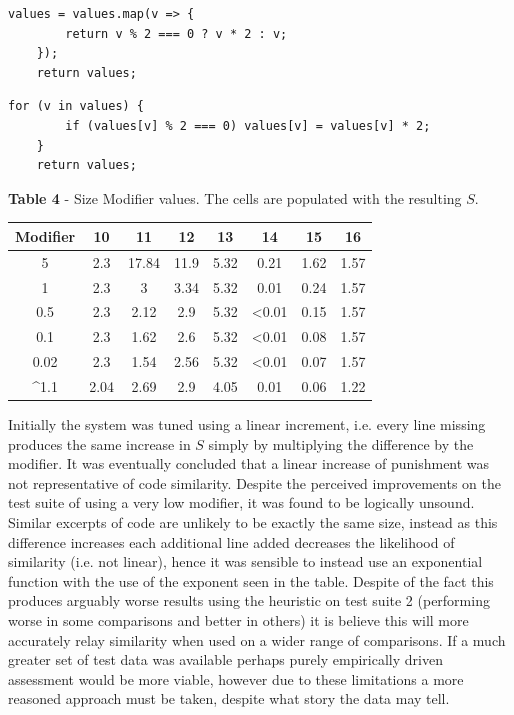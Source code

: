 \documentclass[jou,apacite]{apa6}
\begin{document}
\begin{lstlisting}[caption=Comparison 16a - semantically equivalent, structurally dissimiliar]
values = values.map(v => {
		return v % 2 === 0 ? v * 2 : v;
	});
	return values;
\end{lstlisting}
\begin{lstlisting}[caption=Comparison 16b - - semantically equivalent, structurally dissimiliar]
	for (v in values) {
		if (values[v] % 2 === 0) values[v] = values[v] * 2;
	}
	return values;
\end{lstlisting}

\textbf{Table 4} - Size Modifier values. The cells are populated with the resulting $S$.

\renewcommand{\arraystretch}{1.5}

\begin{center}
 \begin{tabular}{||c c c c c c c c ||} 
 \hline
 Modifier & 10 & 11 & 12 & 13 & 14 & 15 & 16 \\ [-0.2ex] 
 \hline\hline
 5   & 2.3 & 17.84 & 11.9 & 5.32 & 0.21 & 1.62 & 1.57  \\ 
 \hline
 1 & 2.3 & 3 & 3.34 & 5.32 & 0.01 & 0.24 & 1.57 \\ 
  \hline
  0.5 & 2.3 & 2.12 & 2.9 & 5.32 & <0.01 & 0.15 & 1.57  \\ 
   \hline
   0.1 & 2.3 & 1.62 & 2.6 & 5.32 & <0.01 & 0.08 & 1.57 \\ 
    \hline
     0.02 & 2.3 & 1.54 & 2.56 & 5.32 & <0.01 & 0.07 & 1.57\\  
     \hline
      \textasciicircum 1.1 & 2.04 & 2.69 & 2.9 & 4.05 & 0.01 & 0.06 & 1.22 \\ 
      \hline
\end{tabular}
\end{center}

Initially the system was tuned using a linear increment, i.e. every line missing produces the same increase in $S$ simply by multiplying the difference by the modifier. It was eventually concluded that a linear increase of punishment was not representative of code similarity. Despite the perceived improvements on the test suite of using a very low modifier, it was found to be logically unsound. Similar excerpts of code are unlikely to be exactly the same size, instead as this difference increases each additional line added decreases the likelihood of similarity (i.e. not linear), hence it was sensible to instead use an exponential function with the use of the exponent seen in the table.  Despite of the fact this produces arguably worse results using the heuristic on test suite 2 (performing worse in some comparisons and better in others) it is believe this will more accurately relay similarity when used on a wider range of comparisons. If a much greater set of test data was available perhaps purely empirically driven assessment would be more viable, however due to these limitations a more reasoned approach must be taken, despite what story the data may tell. 
\end{document}
